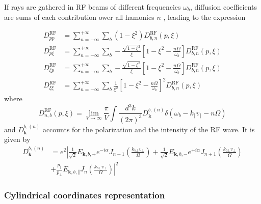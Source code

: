 If rays are gathered in RF beams of different frequencies $\omega_{b}$,
diffusion coefficients are sums of each contribution ower all hamonics $n$ ,
leading to the expression%

\begin{align}
D_{pp}^{\text{RF}}  &  =\sum_{n=-\infty}^{+\infty}\sum_{b}(1-\xi^{2}%
)D_{b,n}^{\text{RF}}(p,\xi)\label{dtensor1}\\
D_{p\xi}^{\text{RF}}  &  =\sum_{n=-\infty}^{+\infty}\sum_{b}-\frac{\sqrt
{1-\xi^{2}}}{\xi}\left[  1-\xi^{2}-\frac{n\Omega}{\omega_{b}}\right]
D_{b,n}^{\text{RF}}(p,\xi)\label{dtensor2}\\
D_{\xi p}^{\text{RF}}  &  =\sum_{n=-\infty}^{+\infty}\sum_{b}-\frac
{\sqrt{1-\xi^{2}}}{\xi}\left[  1-\xi^{2}-\frac{n\Omega}{\omega_{b}}\right]
D_{b,n}^{\text{RF}}(p,\xi)\label{dtensor3}\\
D_{\xi\xi}^{\text{RF}}  &  =\sum_{n=-\infty}^{+\infty}\sum_{b}\frac{1}{\xi
^{2}}\left[  1-\xi^{2}-\frac{n\Omega}{\omega_{b}}\right]  ^{2}D_{b,n}%
^{\text{RF}}(p,\xi) \label{dtensor4}%
\end{align}
where
\begin{equation}
D_{n,b}^{\text{RF}}(p,\xi)=\lim_{V\rightarrow\infty}\frac{\pi}{V}\int
\frac{d^{3}k}{(2\pi)^{3}}D_{\mathbf{k}}^{b,(n)}\delta(\omega_{b}-k_{\Vert
}v_{\Vert}-n\Omega)
\end{equation}
and $D_{\mathbf{k}}^{b,(n)}$ accounts for the polarization and the intensity
of the RF wave. It is given by
\begin{align}
D_{\mathbf{k}}^{b,(n)}&=e^{2}\left|  \frac{1}{\sqrt{2}}E_{\mathbf{k}%
,b,+}e^{-i\alpha}J_{n-1}\left(  \frac{k_{b\bot}v_{\bot}}{\Omega}\right)
+\frac{1}{\sqrt{2}}E_{\mathbf{k},b,-}e^{+i\alpha}J_{n+1}\left(  \frac
{k_{b\bot}v_{\bot}}{\Omega}\right)  \right.\nonumber\\&\left.+\frac{p_{\Vert}}{p_{\bot}}E_{\mathbf{k}%
,b,\Vert}J_{n}\left(  \frac{k_{b\bot}v_{\bot}}{\Omega}\right)  \right|  ^{2}%
\end{align}

\subsubsection{Cylindrical coordinates representation}


